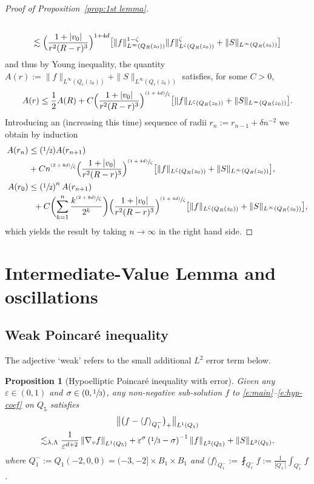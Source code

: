 \documentclass[JEP,XML,SOM,Unicode,NoFloatCountersInSection,published]{cedram}
\newcommand{\Psfrac}[2]{(\sfrac{#1}{#2})}
\newcommand{\psfrac}[2]{\sfrac{(#1)}{#2}}
\newcommand{\bnorm}[1]{\bigl\| #1 \bigr\|}
\newcommand{\nnorm}[1]{\| #1\|}
\newtheorem{proposition}[theorem]{Proposition}
\theoremstyle{definition}
\theoremstyle{remark}
\newcommand{\norm}[1]{\left\| #1 \right\|}
\let\var\varepsilon
\begin{document}
\begin{proof}[Proof of Proposition~\ref{prop:1st lemma}]
\begin{multline*}
\\
\lesssim \Bigl( \frac{1+|v_0|}{r^2(R-r)^3}
\Bigr)^{1+4d} \bigl[ \|f\|_{L^\infty(Q_R(z_0))}^{1-\zeta}
\|f\|_{L^\zeta(Q_R(z_0))}^\zeta +
\|S\|_{L^\infty(Q_R(z_0))}\bigr]
\end{multline*}
and thus by Young inequality, the quantity $A(r) :=
\|f\|_{L^\infty(Q_r(z_0))} + \|S\|_{L^\infty(Q_r(z_0))}$ satisfies,
for some $C>0$,
\begin{align*}
A(r) \le \frac12 A(R) + C \Bigl( \frac{1+|v_0|}{r^2(R-r)^3}
\Bigr)^{\psfrac{1+4d}{\zeta}} \bigl[ \|f\|_{L^\zeta(Q_R(z_0))} +
\|S\|_{L^\infty(Q_R(z_0))}\bigr].
\end{align*}
Introducing an (increasing this time) sequence of radii
$r_n := r_{n-1} + \delta n^{-2}$ we obtain by induction
\begin{align*}
A(r_n) &\le \Psfrac12 A(r_{n+1})\\
& + C n^{\psfrac{2+8d}{\zeta}}
\Bigl( \frac{1+|v_0|}{r^2(R-r)^3}
\Bigr)^{\psfrac{1+4d}{\zeta}} \bigl[ \|f\|_{L^\zeta(Q_R(z_0))} +
\|S\|_{L^\infty(Q_R(z_0))} \bigr], \\
A(r_0) &\le \left( \sfrac12 \right)^n A(r_{n+1}) \\
& \hspace{2mm}+
C \biggl( \sum_{k=1}^n \frac{k^{\psfrac{2+8d}{\zeta}}}{2^k} \biggr)
\Bigl( \frac{1+|v_0|}{r^2(R-r)^3}
\Bigr)^{\psfrac{1+4d}{\zeta}} \bigl[ \|f\|_{L^\zeta(Q_R(z_0))} +
\|S\|_{L^\infty(Q_R(z_0))}\bigr],
\end{align*}
which yields the result by taking $n \to \infty$ in the right
hand side.
\end{proof}

\section{Intermediate-Value Lemma and oscillations}

\subsection{Weak Poincaré inequality}

The adjective `weak' refers to the small additional $L^2$ error
term below.

\begin{proposition}[Hypoelliptic Poincaré inequality with error]
\label{p:HPI lemma}
Given any $\var\in (0,1)$ and $\sigma \in (0,\sfrac13)$, any
non-negative sub-solution $f$ to
\eqref{e:main}--\eqref{e:hyp-coef} on $Q_5$ satisfies
\begin{multline}
\label{HPI inequality}
\bnorm{\bigl(f-\langle f
\rangle_{Q_1^{-}} \bigr)_+}_{L^{1}(Q_1)}\\
\lesssim_{\lambda,\Lambda}
\frac{1}{\varepsilon^{d+2}} \norm{\nabla_v f}_{L^1 (Q_5)}
+ \varepsilon^\sigma \left(
\sfrac13 - \sigma \right)^{-1} \norm{f}_{L^2(Q_5)} +
\nnorm{S}_{L^2(Q_5)},
\end{multline}
where $Q_1^- := Q_1(-2,0,0) = (-3,-2] \times B_1 \times B_1$
and
$\langle f \rangle_{Q_1^{-}} := \fint_{Q_1^-} f :=
\frac{1}{|Q_1^-|} \int_{Q_1^-} f$.
\end{proposition}
\end{document}
